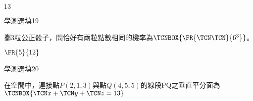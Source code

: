 \begin{QUESTIONS}
\begin{QUESTION}
\begin{QBODY}
        \end{QBODY}
        \begin{QFROMS}
        \end{QFROMS}
        \begin{QTAGS}\end{QTAGS}
        \begin{QANS}
            $13$
        \end{QANS}
        \begin{QSOLLIST}
        \end{QSOLLIST}
        \begin{QEMPTYSPACE}
        \end{QEMPTYSPACE}
    \end{QUESTION}
    \begin{QUESTION}
        \begin{ExamInfo}{88}{學測}{選填}{19}
        \end{ExamInfo}
        \begin{ExamAnsRateInfo}{}{}{}{}
        \end{ExamAnsRateInfo}
        \begin{QBODY}
            擲3粒公正骰子，問恰好有兩粒點數相同的機率為$\TCNBOX{\FR{\TCN\TCN}{6^3}}$。
        \end{QBODY}
        \begin{QFROMS}
        \end{QFROMS}
        \begin{QTAGS}\end{QTAGS}
        \begin{QANS}
            $\FR{5}{12}$
        \end{QANS}
        \begin{QSOLLIST}
        \end{QSOLLIST}
        \begin{QEMPTYSPACE}
        \end{QEMPTYSPACE}
    \end{QUESTION}
    \begin{QUESTION}
        \begin{ExamInfo}{88}{學測}{選填}{20}
        \end{ExamInfo}
        \begin{ExamAnsRateInfo}{}{}{}{}
        \end{ExamAnsRateInfo}
        \begin{QBODY}
            在空間中，連接點$P(2,1,3)$與點$Q(4,5,5)$的線段PQ之垂直平分面為 $\TCNBOX{\TCN x + \TCN y + \TCN z =13 }$
        \end{QBODY}

\end{QUESTION}
\end{QUESTIONS}
